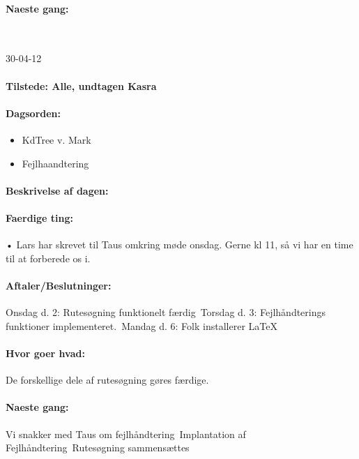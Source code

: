 \documentclass[a4paper,10pt,titlepage]{article}
\begin{document}
		\paragraph{Naeste gang:}\mbox{}\\
		
		\begin{center}
		30-04-12
		\end{center}
		
		\paragraph{Tilstede: Alle, undtagen Kasra}
		\paragraph{Dagsorden:}
		\begin{itemize}
					\item KdTree v. Mark
					\item Fejlhaandtering
		\end{itemize}
		
		\paragraph{Beskrivelse af dagen:}
		
		\paragraph{Faerdige ting:}
		•	Lars har skrevet til Taus omkring møde onsdag. Gerne kl 11, så vi har en time til at forberede os i.
		\paragraph{Aftaler/Beslutninger:}
		Onsdag d. 2: Rutesøgning funktionelt færdig\
Torsdag d. 3: Fejlhåndterings funktioner implementeret.\
Mandag d. 6: Folk installerer LaTeX

		\paragraph{Hvor goer hvad:}
		De forskellige dele af rutesøgning gøres færdige.
		\paragraph{Naeste gang:}
Vi snakker med Taus om fejlhåndtering\
Implantation af Fejlhåndtering\
Rutesøgning sammensættes\mbox{}\\
\end{document}
